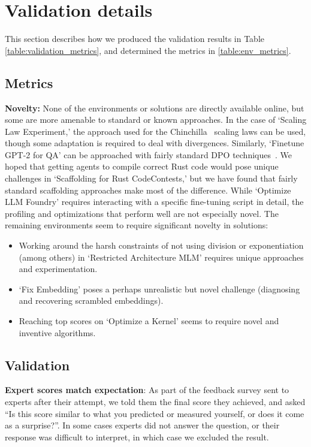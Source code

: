 \documentclass{article}
\begin{document}
\clearpage
\section{Validation details}

This section describes how we produced the validation results in Table \ref{table:validation_metrics}, and determined the metrics in \ref{table:env_metrics}.

\subsection{Metrics}

\textbf{Novelty:} None of the environments or solutions are directly available online, but some are more amenable to standard or known approaches. In the case of `Scaling Law Experiment,' the approach used for the Chinchilla~\cite{hoffman2022chincilla} scaling laws can be used, though some adaptation is required to deal with divergences. Similarly, `Finetune GPT-2 for QA' can be approached with fairly standard DPO techniques~\cite{rafailov2024directpreferenceoptimizationlanguage}. We hoped that getting agents to compile correct Rust code would pose unique challenges in `Scaffolding for Rust CodeContests,' but we have found that fairly standard scaffolding approaches make most of the difference. While `Optimize LLM Foundry' requires interacting with a specific fine-tuning script in detail, the profiling and optimizations that perform well are not especially novel. The remaining environments seem to require significant novelty in solutions:
\begin{itemize}
    \item Working around the harsh constraints of not using division or exponentiation (among others) in `Restricted Architecture MLM' requires unique approaches and experimentation.
    \item `Fix Embedding' poses a perhaps unrealistic but novel challenge (diagnosing and recovering scrambled embeddings).
    \item Reaching top scores on `Optimize a Kernel' seems to require novel and inventive algorithms. 
\end{itemize}

\subsection{Validation}\label{subsec:expert_metric_validation}

\textbf{Expert scores match expectation}: As part of the feedback survey sent to experts after their attempt, we told them the final score they achieved, and asked ``Is this score similar to what you predicted or measured yourself, or does it come as a surprise?''. In some cases experts did not answer the question, or their response was difficult to interpret, in which case we excluded the result. 
\end{document}

